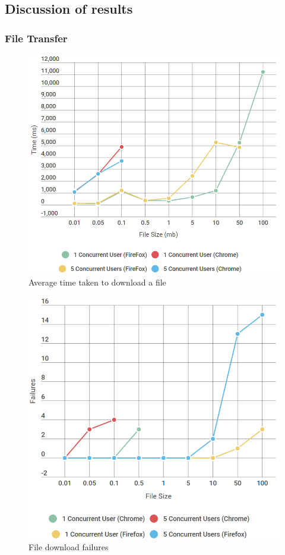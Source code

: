 \documentclass[]{report}
\begin{document}
		\subsection{Discussion of results}
			\subsubsection{File Transfer}
			\begin{figure}[H]
				\caption{Average time taken to download a file}
				\centering
				\includegraphics[scale=0.5]{download-chart.png}
			\end{figure}
			\begin{figure}[H]
				\caption{File download failures}
				\centering
				\includegraphics[scale=0.5]{download-failures-chart.png}
			\end{figure}
		
\end{document}
